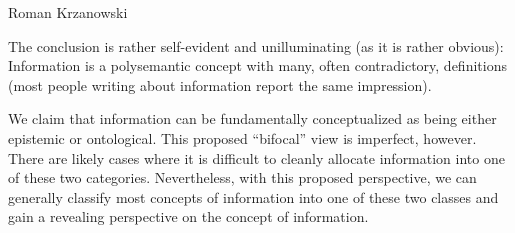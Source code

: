\begin{artengenv}{Roman Krzanowski}

The conclusion is rather self-evident and unilluminating (as it is rather obvious): Information is a polysemantic concept with many, often contradictory, definitions (most people writing about information report the same impression).

We claim that information can be fundamentally conceptualized as being either epistemic or ontological. This proposed ``bifocal'' view is imperfect, however. There are likely cases where it is difficult to cleanly allocate information into one of these two categories. Nevertheless, with this proposed perspective, we can generally classify most concepts of information into one of these two classes and gain a revealing perspective on the concept of information.


\end{artengenv}
